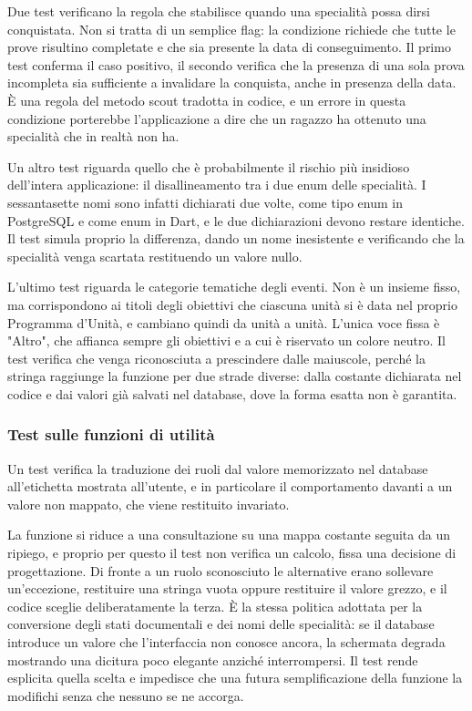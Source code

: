 \documentclass[11pt]{article}
\numberwithin{figure}{section}
\begin{document}
Due test verificano la regola che stabilisce quando una specialità possa dirsi conquistata. Non si tratta di un semplice flag: la condizione richiede che tutte le prove risultino completate e che sia presente la data di conseguimento. Il primo test conferma il caso positivo, il secondo verifica che la presenza di una sola prova incompleta sia sufficiente a invalidare la conquista, anche in presenza della data. È una regola del metodo scout tradotta in codice, e un errore in questa condizione porterebbe l'applicazione a dire che un ragazzo ha ottenuto una specialità che in realtà non ha.

Un altro test riguarda quello che è probabilmente il rischio più insidioso dell'intera applicazione: il disallineamento tra i due enum delle specialità. I sessantasette nomi sono infatti dichiarati due volte, come tipo enum in PostgreSQL e come enum in Dart, e le due dichiarazioni devono restare identiche. Il test simula proprio la differenza, dando un nome inesistente e verificando che la specialità venga scartata restituendo un valore nullo.

L'ultimo test riguarda le categorie tematiche degli eventi. Non è un insieme fisso, ma corrispondono ai titoli degli obiettivi che ciascuna unità si è data nel proprio Programma d'Unità, e cambiano quindi da unità a unità. L'unica voce fissa è "Altro", che affianca sempre gli obiettivi e a cui è riservato un colore neutro. Il test verifica che venga riconosciuta a prescindere dalle maiuscole, perché la stringa raggiunge la funzione per due strade diverse: dalla costante dichiarata nel codice e dai valori già salvati nel database, dove la forma esatta non è garantita.

\subsubsection{Test sulle funzioni di utilità}

Un test verifica la traduzione dei ruoli dal valore memorizzato nel database all'etichetta mostrata all'utente, e in particolare il comportamento davanti a un valore non mappato, che viene restituito invariato.

La funzione si riduce a una consultazione su una mappa costante seguita da un ripiego, e proprio per questo il test non verifica un calcolo, fissa una decisione di progettazione. Di fronte a un ruolo sconosciuto le alternative erano sollevare un'eccezione, restituire una stringa vuota oppure restituire il valore grezzo, e il codice sceglie deliberatamente la terza. È la stessa politica adottata per la conversione degli stati documentali e dei nomi delle specialità: se il database introduce un valore che l'interfaccia non conosce ancora, la schermata degrada mostrando una dicitura poco elegante anziché interrompersi. Il test rende esplicita quella scelta e impedisce che una futura semplificazione della funzione la modifichi senza che nessuno se ne accorga.
\end{document}
